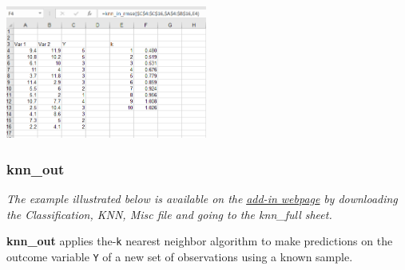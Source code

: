 \documentclass[12pt]{article}
\begin{document}
\begin{enumerate}
\centerline{\includegraphics[width=2.6in]{figures/knnrmse3}}

\medskip
\end{enumerate}

\subsubsection{knn\_out}

\textit{The example illustrated below is available on the}  \href{https://www8.gsb.columbia.edu/bizanalytics/excel-add-in/multiplatform#h-4}{ \textit{add-in webpage}}
 \textit{by downloading the Classification, KNN, Misc file and going to the knn\_full sheet.}

\textbf{knn\_out} applies the-\texttt{k} nearest neighbor algorithm to make predictions on the outcome variable \texttt{Y} of a new set of observations using a known sample.
\end{document}
